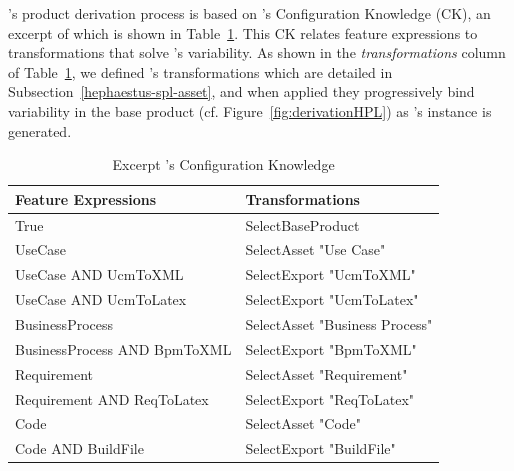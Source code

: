 \hpl's product derivation process is based on \hpl's Configuration Knowledge (CK), an excerpt of which is shown in Table~\ref{tab:ck-hpl}. 
This CK relates feature expressions to transformations that solve \hpl{}'s variability.
As shown in the \textit{transformations} column of Table~\ref{tab:ck-hpl}, we defined \hpl's transformations which are detailed in Subsection~\ref{hephaestus-spl-asset}, and when applied they progressively bind variability in the base product (cf. Figure~\ref{fig:derivationHPL}) as  \hpl's instance is generated.




\begin{table}[h]
\begin{center}
\begin{tabular}{||l||l||}
  \hline
  \textbf{Feature Expressions} & \textbf{Transformations}   \\  \hline
  True & SelectBaseProduct \\  \hline
  UseCase & SelectAsset "Use Case" \\ \hline
  UseCase AND UcmToXML & SelectExport "UcmToXML"  \\ \hline
  UseCase AND UcmToLatex & SelectExport "UcmToLatex" \\ \hline
  BusinessProcess & SelectAsset "Business Process" \\ \hline
  BusinessProcess AND BpmToXML & SelectExport "BpmToXML" \\ \hline
  Requirement & SelectAsset "Requirement" \\ \hline
  Requirement AND ReqToLatex & SelectExport "ReqToLatex" \\ \hline
  Code & SelectAsset "Code" \\ \hline
  Code AND BuildFile & SelectExport "BuildFile" \\ \hline
\end{tabular}
\caption{Excerpt \hpl's Configuration Knowledge}
\label{tab:ck-hpl}
\end{center}
\end{table}



